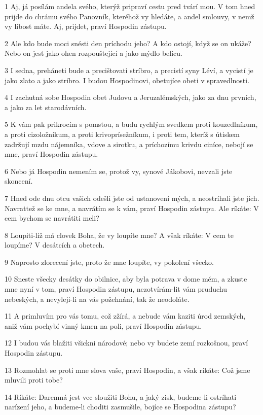 \par 1 Aj, já posílám andela svého, kterýž pripraví cestu pred tvárí mou. V tom hned prijde do chrámu svého Panovník, kteréhož vy hledáte, a andel smlouvy, v nemž vy líbost máte. Aj, prijdet, praví Hospodin zástupu.
\par 2 Ale kdo bude moci snésti den príchodu jeho? A kdo ostojí, když se on ukáže? Nebo on jest jako ohen rozpouštející a jako mýdlo belicu.
\par 3 I sedna, preháneti bude a precištovati stríbro, a precistí syny Léví, a vycistí je jako zlato a jako stríbro. I budou Hospodinovi, obetujíce obeti v spravedlnosti.
\par 4 I zachutná sobe Hospodin obet Judovu a Jeruzalémských, jako za dnu prvních, a jako za let starodávních.
\par 5 K vám pak prikrocím s pomstou, a budu rychlým svedkem proti kouzedlníkum, a proti cizoložníkum, a proti krivoprísežníkum, i proti tem, kteríž s útiskem zadržují mzdu nájemníka, vdove a sirotku, a príchozímu krivdu ciníce, nebojí se mne, praví Hospodin zástupu.
\par 6 Nebo já Hospodin nemením se, protož vy, synové Jákobovi, nevzali jste skoncení.
\par 7 Hned ode dnu otcu vašich odešli jste od ustanovení mých, a neostríhali jste jich. Navrattež se ke mne, a navrátím se k vám, praví Hospodin zástupu. Ale ríkáte: V cem bychom se navrátiti meli?
\par 8 Loupiti-liž má clovek Boha, že vy loupíte mne? A však ríkáte: V cem te loupíme? V desátcích a obetech.
\par 9 Naprosto zlorecení jste, proto že mne loupíte, vy pokolení všecko.
\par 10 Sneste všecky desátky do obilnice, aby byla potrava v dome mém, a zkuste mne nyní v tom, praví Hospodin zástupu, nezotvírám-lit vám pruduchu nebeských, a nevyleji-li na vás požehnání, tak že neodoláte.
\par 11 A primluvím pro vás tomu, což zžírá, a nebude vám kaziti úrod zemských, aniž vám pochybí vinný kmen na poli, praví Hospodin zástupu.
\par 12 I budou vás blažiti všickni národové; nebo vy budete zemí rozkošnou, praví Hospodin zástupu.
\par 13 Rozmohlat se proti mne slova vaše, praví Hospodin, a však ríkáte: Což jsme mluvili proti tobe?
\par 14 Ríkáte: Daremná jest vec sloužiti Bohu, a jaký zisk, budeme-li ostríhati narízení jeho, a budeme-li choditi zasmušile, bojíce se Hospodina zástupu?
